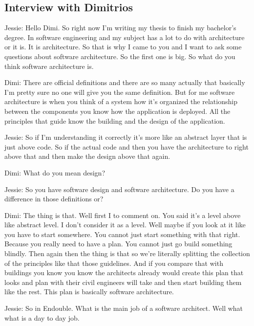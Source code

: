 \subsection{Interview with Dimitrios}

Jessie: Hello Dimi. So right now I'm writing my thesis to finish my bachelor's degree. In software engineering and my subject has a lot to do with architecture or it is. It is architecture. So that is why I came to you and I want to ask some questions about software architecture. So the first one is big. So what do you think software architecture is.

Dimi: There are official definitions and there are so many actually that basically I'm pretty sure no one will give you the same definition. But for me software architecture is when you think of a system how it's organized the relationship between the components you know how the application is deployed. All the principles that guide know the building and the design of the application.

Jessie: So if I'm understanding it correctly it's more like an abstract layer that is just above code. So if the actual code and then you have the architecture to right above that and then make the design above that again.

Dimi: What do you mean design?

Jessie: So you have software design and software architecture. Do you have a difference in those definitions or?

Dimi: The thing is that. Well first I to comment on. You said it's a level above like abstract level. I don't consider it as a level. Well maybe if you look at it like you have to start somewhere. You cannot just start something with that right. Because you really need to have a plan. You cannot just go build something blindly. Then again then the thing is that so we're literally splitting the collection of the principles like that those guidelines. And if you compare that with buildings you know you know the architects already would create this plan that looks and plan with their civil engineers will take and then start building them like the rest. This plan is basically software architecture.

Jessie: So in Endouble. What is the main job of a software architect. Well what what is a day to day job.

